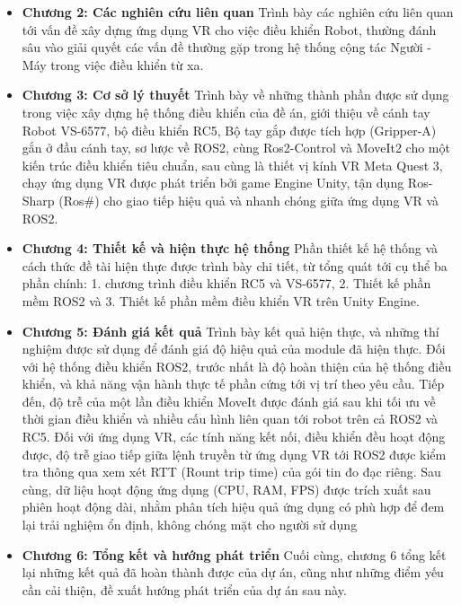\begin{itemize}
    \item \textbf{Chương 2: Các nghiên cứu liên quan} Trình bày các nghiên cứu liên quan tới vấn đề xây dựng ứng dụng VR cho việc điều khiển Robot, thường đánh sâu vào giải quyết các vấn đề thường gặp trong hệ thống cộng tác Người - Máy trong việc điều khiển từ xa.
    \item \textbf{Chương 3: Cơ sở lý thuyết} Trình bày về những thành phần được sử dụng trong việc xây dựng hệ thống điều khiển của đề án, giới thiệu về cánh tay Robot VS-6577, bộ điều khiển RC5, Bộ tay gắp được tích hợp (Gripper-A) gắn ở đầu cánh tay, sơ lược về ROS2, cùng Ros2-Control và MoveIt2 cho một kiến trúc điều khiển tiêu chuẩn, sau cùng là thiết vị kính VR Meta Quest 3, chạy ứng dụng VR được phát triển bởi game Engine Unity, tận dụng Ros-Sharp (Ros\#) cho giao tiếp hiệu quả và nhanh chóng giữa ứng dụng VR và ROS2.
    \item \textbf{Chương 4: Thiết kế và hiện thực hệ thống} Phần thiết kế hệ thống và cách thức đề tài hiện thực được trình bày chi tiết, từ tổng quát tới cụ thể ba phần chính: 1. chương trình điều khiển RC5 và VS-6577, 2. Thiết kế phần mềm ROS2 và 3. Thiết kế phần mềm điều khiển VR trên Unity Engine. 
    \item \textbf{Chương 5: Đánh giá kết quả} Trình bày kết quả hiện thực, và những thí nghiệm được sử dụng để đánh giá độ hiệu quả của module đã hiện thực. Đối với hệ thống điều khiển ROS2, trước nhất là độ hoàn thiện của hệ thống điều khiển, và khả năng vận hành thực tế phần cứng tới vị trí theo yêu cầu. Tiếp đến, độ trễ của một lần điều khiển MoveIt được đánh giá sau khi tối ưu về thời gian điều khiển và nhiều cấu hình liên quan tới robot trên cả ROS2 và RC5. Đối với ứng dụng VR, các tính năng kết nối, điều khiển đều hoạt động được, độ trễ giao tiếp giữa lệnh truyền từ ứng dụng VR tới ROS2 được kiểm tra thông qua xem xét RTT (Rount trip time) của gói tin đo đạc riêng. Sau cùng, dữ liệu hoạt động ứng dụng (CPU, RAM, FPS) được trích xuất sau phiên hoạt động dài, nhằm phân tích hiệu quả ứng dụng có phù hợp để đem lại trải nghiệm ổn định, không chóng mặt cho người sử dụng 
    \item \textbf{Chương 6: Tổng kết và hướng phát triển} Cuối cùng, chương 6 tổng kết lại những kết quả đã hoàn thành được của dự án, cũng như những điểm yếu cần cải thiện, đề xuất hướng phát triển của dự án sau này.
\end{itemize}